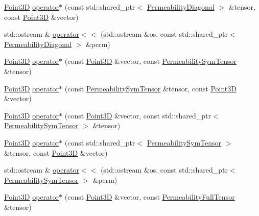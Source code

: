\begin{DoxyCompactItemize}
\item 
\hyperlink{classFVCode3D_1_1Point3D}{Point3D} \hyperlink{namespaceFVCode3D_ac318aebf33fb93f512357d07452b7d2e}{operator$\ast$} (const std\+::shared\+\_\+ptr$<$ \hyperlink{classFVCode3D_1_1PermeabilityDiagonal}{Permeability\+Diagonal} $>$ \&tensor, const \hyperlink{classFVCode3D_1_1Point3D}{Point3D} \&vector)
\item 
std\+::ostream \& \hyperlink{namespaceFVCode3D_aa140a41198afe73b0908519f8900cc84}{operator$<$$<$} (std\+::ostream \&os, const std\+::shared\+\_\+ptr$<$ \hyperlink{classFVCode3D_1_1PermeabilityDiagonal}{Permeability\+Diagonal} $>$ \&perm)
\item 
\hyperlink{classFVCode3D_1_1Point3D}{Point3D} \hyperlink{namespaceFVCode3D_a3dfa2f38d2f7f0218cab1d9ec22b18b6}{operator$\ast$} (const \hyperlink{classFVCode3D_1_1Point3D}{Point3D} \&vector, const \hyperlink{classFVCode3D_1_1PermeabilitySymTensor}{Permeability\+Sym\+Tensor} \&tensor)
\item 
\hyperlink{classFVCode3D_1_1Point3D}{Point3D} \hyperlink{namespaceFVCode3D_a5ac5e83475a87f9f243d5bf10090c28e}{operator$\ast$} (const \hyperlink{classFVCode3D_1_1PermeabilitySymTensor}{Permeability\+Sym\+Tensor} \&tensor, const \hyperlink{classFVCode3D_1_1Point3D}{Point3D} \&vector)
\item 
\hyperlink{classFVCode3D_1_1Point3D}{Point3D} \hyperlink{namespaceFVCode3D_aeeedc276df199179c196980e5b3e5647}{operator$\ast$} (const \hyperlink{classFVCode3D_1_1Point3D}{Point3D} \&vector, const std\+::shared\+\_\+ptr$<$ \hyperlink{classFVCode3D_1_1PermeabilitySymTensor}{Permeability\+Sym\+Tensor} $>$ \&tensor)
\item 
\hyperlink{classFVCode3D_1_1Point3D}{Point3D} \hyperlink{namespaceFVCode3D_ac463524bf8214736ff565b8eb89f5dfa}{operator$\ast$} (const std\+::shared\+\_\+ptr$<$ \hyperlink{classFVCode3D_1_1PermeabilitySymTensor}{Permeability\+Sym\+Tensor} $>$ \&tensor, const \hyperlink{classFVCode3D_1_1Point3D}{Point3D} \&vector)
\item 
std\+::ostream \& \hyperlink{namespaceFVCode3D_aee190d20e7d59a358f6e3c5738473728}{operator$<$$<$} (std\+::ostream \&os, const std\+::shared\+\_\+ptr$<$ \hyperlink{classFVCode3D_1_1PermeabilitySymTensor}{Permeability\+Sym\+Tensor} $>$ \&perm)
\item 
\hyperlink{classFVCode3D_1_1Point3D}{Point3D} \hyperlink{namespaceFVCode3D_a8da6a56bd95d604552fb78bdab29b491}{operator$\ast$} (const \hyperlink{classFVCode3D_1_1Point3D}{Point3D} \&vector, const \hyperlink{classFVCode3D_1_1PermeabilityFullTensor}{Permeability\+Full\+Tensor} \&tensor)

\end{DoxyCompactItemize}
